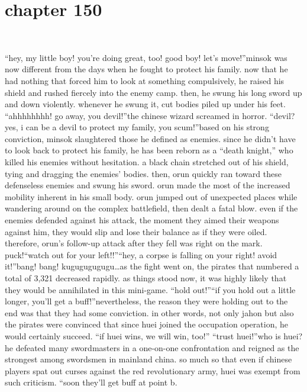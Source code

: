 \section{chapter 150}

                             




“hey, my little boy! you’re doing great, too! good boy! let’s move!”minsok was now different from the days when he fought to protect his family.
 now that he had nothing that forced him to look at something compulsively, he raised his shield and rushed fiercely into the enemy camp.
then, he swung his long sword up and down violently.
 whenever he swung it, cut bodies piled up under his feet.
“ahhhhhhhh! go away, you devil!”the chinese wizard screamed in horror.
“devil? yes, i can be a devil to protect my family, you scum!”based on his strong conviction, minsok slaughtered those he defined as enemies.
 since he didn’t have to look back to protect his family, he has been reborn as a “death knight,” who killed his enemies without hesitation.
a black chain stretched out of his shield, tying and dragging the enemies’ bodies.
then, orun quickly ran toward these defenseless enemies and swung his sword.
orun made the most of the increased mobility inherent in his small body.
 orun jumped out of unexpected places while wandering around on the complex battlefield, then dealt a fatal blow.
even if the enemies defended against his attack, the moment they aimed their weapons against him, they would slip and lose their balance as if they were oiled.
 therefore, orun’s follow-up attack after they fell was right on the mark.
puck!“watch out for your left!!”“hey, a corpse is falling on your right! avoid it!”bang! bang! kugugugugugu…as the fight went on, the pirates that numbered a total of 3,321 decreased rapidly.
 as things stood now, it was highly likely that they would be annihilated in this mini-game.
“hold out!”“if you hold out a little longer, you’ll get a buff!”nevertheless, the reason they were holding out to the end was that they had some conviction.
 in other words, not only jahon but also the pirates were convinced that since huei joined the occupation operation, he would certainly succeed.
“if huei wins, we will win, too!”
“trust huei!”who is huei? he defeated many swordmasters in a one-on-one confrontation and reigned as the strongest among swordsmen in mainland china.
 so much so that even if chinese players spat out curses against the red revolutionary army, huei was exempt from such criticism.
“soon they’ll get buff at point b.
